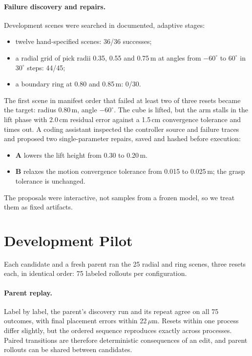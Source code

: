 \documentclass[letterpaper]{article} %
\begin{document}
\paragraph{Failure discovery and repairs.} Development scenes were searched in documented, adaptive stages:
\begin{itemize}
\item twelve hand-specified scenes: 36/36 successes;
\item a radial grid of pick radii 0.35, 0.55 and 0.75\,m at angles from $-60^\circ$ to $60^\circ$ in $30^\circ$ steps: 44/45;
\item a boundary ring at 0.80 and 0.85\,m: 0/30.
\end{itemize}
The first scene in manifest order that failed at least two of three resets became the target: radius 0.80\,m, angle $-60^\circ$. The cube is lifted, but the arm stalls in the lift phase with 2.0\,cm residual error against a 1.5\,cm convergence tolerance and times out. A coding assistant inspected the controller source and failure traces and proposed two single-parameter repairs, saved and hashed before execution:
\begin{itemize}
\item \textbf{A} lowers the lift height from 0.30 to 0.20\,m.
\item \textbf{B} relaxes the motion convergence tolerance from 0.015 to 0.025\,m; the grasp tolerance is unchanged.
\end{itemize}
The proposals were interactive, not samples from a frozen model, so we treat them as fixed artifacts.

\section{Development Pilot}
Each candidate and a fresh parent ran the 25 radial and ring scenes, three resets each, in identical order: 75 labeled rollouts per configuration.

\paragraph{Parent replay.} Label by label, the parent's discovery run and its repeat agree on all 75 outcomes, with final placement errors within 22\,$\mu$m. Resets within one process differ slightly, but the ordered sequence reproduces exactly across processes. Paired transitions are therefore deterministic consequences of an edit, and parent rollouts can be shared between candidates.
\end{document}
